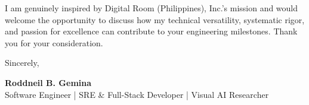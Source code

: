 \documentclass[letterpaper,11pt]{article}
\begin{document}
I am genuinely inspired by Digital Room (Philippines), Inc.'s mission and would welcome the opportunity to discuss how my technical versatility, systematic rigor, and passion for excellence can contribute to your engineering milestones. Thank you for your consideration.

Sincerely,

\vspace{12pt}
\textbf{Roddneil B. Gemina} \\
Software Engineer | SRE \& Full-Stack Developer | Visual AI Researcher
\end{document}
